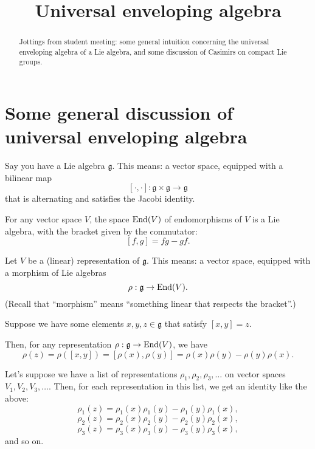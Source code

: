 \documentclass[reqno]{amsart} 
\title{Universal enveloping algebra}
\begin{document}
\begin{abstract}
  Jottings from student meeting: some general intuition concerning the universal enveloping algebra of a Lie algebra, and some discussion of Casimirs on compact Lie groups.
\end{abstract}

\maketitle

\section{Some general discussion of universal enveloping algebra}\label{sec:cngsxurern}
Say you have a Lie algebra $\mathfrak{g}$.  This means: a vector space, equipped with a bilinear map
\begin{equation*}
  {} [\cdot, \cdot] : \mathfrak{g} \times \mathfrak{g} \rightarrow \mathfrak{g}
\end{equation*}
that is alternating and satisfies the Jacobi identity.

\begin{example}\label{example:cngsxuq83x}
  For any vector space $V$, the space $\operatorname{End}(V)$ of endomorphisms of $V$ is a Lie algebra, with the bracket given by the commutator:
  \begin{equation*}
    {} [f, g] = f g - g f.
  \end{equation*}
\end{example}

Let $V$ be a (linear) representation of $\mathfrak{g}$.  This means: a vector space, equipped with a morphism of Lie algebras
\begin{equation*}
  \rho : \mathfrak{g} \rightarrow \operatorname{End}(V).
\end{equation*}
(Recall that ``morphism'' means ``something linear that respects the bracket''.)

Suppose we have some elements $x, y, z \in \mathfrak{g}$ that satisfy $[x,y] = z$.

Then, for any representation $\rho : \mathfrak{g} \rightarrow \operatorname{End}(V)$, we have
\begin{equation*}
  \rho(z) = \rho([x,y]) = [\rho(x), \rho(y)] = \rho(x) \rho(y) - \rho(y) \rho(x).
\end{equation*}

Let's suppose we have a list of representations $\rho_1, \rho_2, \rho_3, \dotsc$ on vector spaces $V_1, V_2, V_3, \dotsc$.  Then, for each representation in this list, we get an identity like the above:
\begin{equation*}
  \rho_1(z) = \rho_1(x) \rho_1(y) - \rho_1(y) \rho_1(x),
\end{equation*}
\begin{equation*}
  \rho_2(z) = \rho_2(x) \rho_2(y) - \rho_2(y) \rho_2(x),
\end{equation*}
\begin{equation*}
  \rho_3(z) = \rho_3(x) \rho_3(y) - \rho_3(y) \rho_3(x),
\end{equation*}
and so on.
\end{document}
